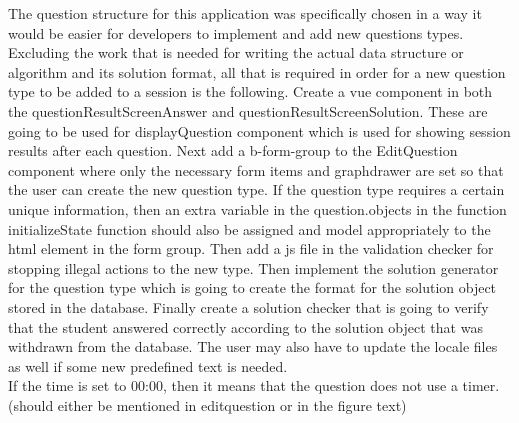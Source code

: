The question structure for this application was specifically chosen in a way it would be easier for developers to implement and add new questions types. Excluding the work that is needed for writing the actual data structure or algorithm and its solution format, all that is required in order for a new question type to be added to a session is the following. Create a vue component in both the questionResultScreenAnswer and questionResultScreenSolution. These are going to be used for displayQuestion component which is used for showing session results after each question. Next add a b-form-group to the EditQuestion component where only the necessary form items and graphdrawer are set so that the user can create the new question type. If the question type requires a certain unique information, then an extra variable in the question.objects in the function initializeState function should also be assigned and model appropriately to the html element in the form group. Then add a js file in the validation checker for stopping illegal actions to the new type. Then implement the solution generator for the question type which is going to create the format for the solution object stored in the database. Finally create a solution checker that is going to verify that the student answered correctly according to the solution object that was withdrawn from the database. The user may also have to update the locale files as well if some new predefined text is needed.\\[11pt]
If the time is set to 00:00, then it means that the question does not use a timer. (should either be mentioned in editquestion or in the figure text)
